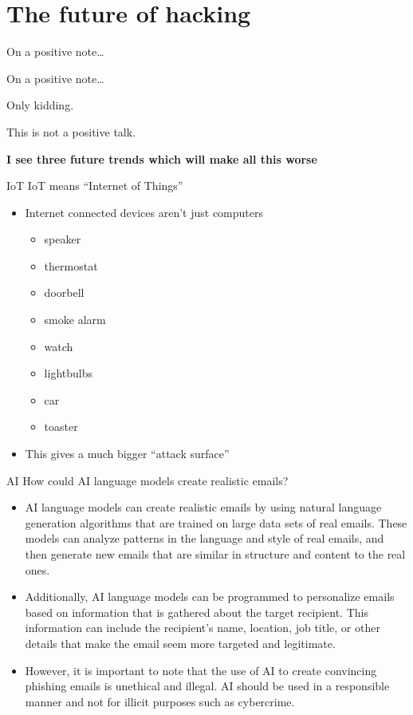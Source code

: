 \documentclass[xcolor=table]{beamer}
\begin{document}
\section{The future of hacking}
\begin{frame}{On a positive note\ldots}
\end{frame}
\begin{frame}{On a positive note\ldots}

Only kidding. 


	\vspace{0.5em}

	This is not a positive talk.

	\vspace{0.5em}

	\textbf{I see three future trends which will make all this worse}

\end{frame}
\begin{frame}{IoT}
	IoT means ``Internet of Things''
	\begin{itemize}
		\item Internet connected devices aren't just computers
			\begin{itemize}
				\item speaker
				\item thermostat
				\item doorbell
				\item smoke alarm
				\item watch
				\item lightbulbs
				\item car
				\item toaster
			\end{itemize}
		\item This gives a much bigger ``attack surface''
	\end{itemize}

\end{frame}
\begin{frame}{AI}
	How could AI language models create realistic emails?
	\begin{itemize}
		\item AI language models can create realistic emails by using natural language generation algorithms that are trained on large data sets of real emails. These models can analyze patterns in the language and style of real emails, and then generate new emails that are similar in structure and content to the real ones.

		\item Additionally, AI language models can be programmed to personalize emails based on information that is gathered about the target recipient. This information can include the recipient's name, location, job title, or other details that make the email seem more targeted and legitimate.

		\item However, it is important to note that the use of AI to create convincing phishing emails is unethical and illegal. AI should be used in a responsible manner and not for illicit purposes such as cybercrime.
	\end{itemize}
\end{frame}
\end{document}
